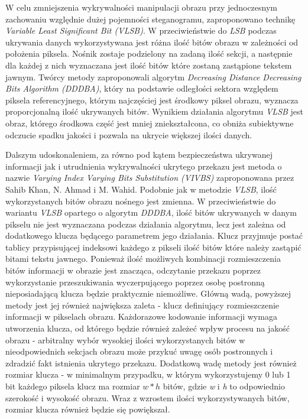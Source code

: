 {{{            %
            W celu zmniejszenia wykrywalności manipulacji obrazu przy jednoczesnym zachowaniu względnie dużej pojemności
            steganogramu, zaproponowano technikę \textit{Variable Least Significant Bit
            (VLSB)}\cite{Khan2011ImplementationOV}. W przeciwieństwie do \textit{LSB} podczas ukrywania danych
            wykorzystywana jest różna ilość bitów obrazu w zależności od położenia piksela. Nośnik zostaje podzielony na
            zadaną ilość sekcji, a następnie dla każdej z nich wyznaczana jest ilość bitów które zostaną zastąpione
            tekstem  jawnym. Twórcy metody zaproponowali algorytm \textit{Decreasing Distance Decreasing Bits Algorithm
            (DDDBA)},  który na podstawie odległości sektora względem piksela referencyjnego, którym najczęściej jest
            środkowy piksel  obrazu, wyznacza proporcjonalną ilość ukrywanych bitów. Wynikiem działania algorytmu
            \textit{VLSB} jest obraz,  którego środkowa część jest mniej zniekształcona, co obniża subiektywne odczucie
            spadku jakości i pozwala na  ukrycie większej ilości danych\cite{Khan2011ImplementationOV}.

            Dalszym udoskonaleniem, za równo pod kątem bezpieczeństwa ukrywanej informacji jak i utrudnienia
            wykrywalności  ukrytego przekazu jest metoda o nazwie \textit{Varying Index Varying Bits Substitution
            (VIVBS)} zaproponowana  przez Sahib Khan, N. Ahmad i M. Wahid\cite{Khan2016VaryingIV}. Podobnie jak w
            metodzie \textit{VLSB}, ilość  wykorzystanych bitów obrazu nośnego jest zmienna. W przeciwieństwie do
            wariantu \textit{VLSB} opartego o  algorytm \textit{DDDBA}, ilość bitów ukrywanych w danym pikselu nie jest
            wyznaczana podczas działania algorytmu,  lecz jest zależna od dodatkowego klucza będącego parametrem jego
            działania. Klucz przyjmuje postać tablicy  przypisującej indeksowi każdego z pikseli ilość bitów które
            należy zastąpić bitami tekstu jawnego. Ponieważ  ilość możliwych kombinacji rozmieszczenia bitów informacji
            w obrazie jest znacząca, odczytanie przekazu poprzez  wykorzystanie przeszukiwania wyczerpującego poprzez
            osobę postronną nieposiadającą klucza będzie praktycznie  niemożliwe. Główną wadą, powyższej metody jest jej
            również największa zaleta - klucz definiujący rozmieszczenie  informacji w pikselach obrazu. Każdorazowe
            kodowanie informacji wymaga utworzenia klucza, od którego będzie  również zależeć wpływ procesu na jakość
            obrazu - arbitralny wybór wysokiej ilości wykorzystanych bitów w  nieodpowiednich sekcjach obrazu może
            przykuć uwagę osób postronnych i zdradzić fakt istnienia ukrytego przekazu.  Dodatkową wadę metody jest
            również rozmiar klucza -  w minimalnym przypadku, w którym wykorzystujemy 0 lub 1 bit  każdego piksela klucz
            ma rozmiar $w * h$ bitów, gdzie \textit{w} i \textit{h} to odpowiednio szerokość i  wysokość obrazu. Wraz z
            wzrostem ilości wykorzystywanych bitów, rozmiar klucza również będzie się
            powiększał\cite{Khan2016VaryingIV}.

}}}
